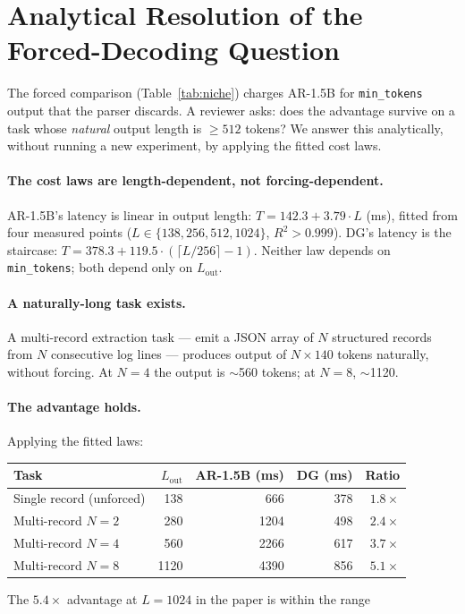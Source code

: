 \section{Analytical Resolution of the Forced-Decoding Question}
\label{app:forced} The forced comparison (Table~\ref{tab:niche}) charges AR-1.5B for
\texttt{min\_tokens} output that the parser discards. A reviewer asks:
does the advantage survive on a task whose \emph{natural} output length
is $\geq 512$ tokens? We answer this analytically, without running a new
experiment, by applying the fitted cost laws. \paragraph{The cost laws are length-dependent, not forcing-dependent.}
AR-1.5B's latency is linear in output length: $T = 142.3 + 3.79 \cdot L$
(ms), fitted from four measured points ($L \in \{138, 256, 512, 1024\}$,
$R^2 > 0.999$). DG's latency is the staircase:
$T = 378.3 + 119.5 \cdot (\lceil L/256 \rceil - 1)$. Neither law depends
on \texttt{min\_tokens}; both depend only on $L_{\mathrm{out}}$. \paragraph{A naturally-long task exists.}
A multi-record extraction task --- emit a JSON array of $N$ structured
records from $N$ consecutive log lines --- produces output of
$N \times 140$ tokens naturally, without forcing. At $N{=}4$ the output
is $\sim$560 tokens; at $N{=}8$, $\sim$1120. \paragraph{The advantage holds.}
Applying the fitted laws: \begin{center}
\begin{tabular}{@{}lrrrr@{}}
\toprule
Task & $L_{\mathrm{out}}$ & AR-1.5B (ms) & DG (ms) & Ratio \\
\midrule
Single record (unforced) & 138 & 666 & 378 & $1.8\times$ \\
Multi-record $N{=}2$ & 280 & 1204 & 498 & $2.4\times$ \\
Multi-record $N{=}4$ & 560 & 2266 & 617 & $3.7\times$ \\
Multi-record $N{=}8$ & 1120 & 4390 & 856 & $5.1\times$ \\
\bottomrule
\end{tabular}
\end{center} The $5.4\times$ advantage at $L{=}1024$ in the paper is within the range
